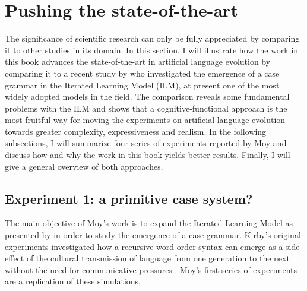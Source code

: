 \section{Pushing the state-of-the-art}
\label{s:impact}

The significance of scientific research can only be fully appreciated by comparing it to other studies in its domain. In this section, I will illustrate how the work in this book advances the state-of-the-art in artificial language evolution by comparing it to a recent study by \citet{moy06case} who investigated the emergence of a case grammar in the Iterated Learning Model (ILM), at present one of the most widely adopted models in the field. The comparison reveals some fundamental problems with the ILM and shows that a cognitive-functional approach is the most fruitful way for moving the experiments on artificial language evolution towards greater complexity, expressiveness and realism. In the following subsections, I will summarize four series of experiments reported by Moy and discuss how and why the work in this book yields better results. Finally, I will give a general overview of both approaches.

\subsection{Experiment 1: a primitive case system?}

The main objective of Moy's work is to expand the Iterated Learning Model as presented by \citet{kirby02learning} in order to study the emergence of a case grammar. Kirby's original experiments investigated how a recursive word-order syntax can emerge as a side-effect of the cultural transmission of language from one generation to the next without the need for communicative pressures \citep[the so-called `function independence principle', ][]{brighton05cultural}. Moy's first series of experiments are a replication of these simulations.


